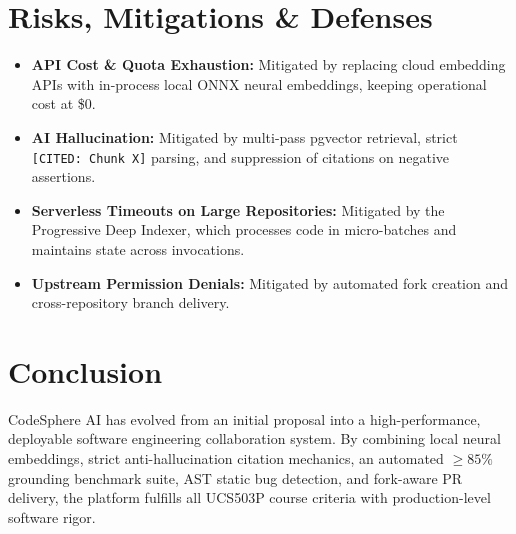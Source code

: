 \documentclass[11pt,a4paper]{article}
\begin{document}
\section{Risks, Mitigations \& Defenses}
\begin{itemize}
    \item \textbf{API Cost \& Quota Exhaustion:} Mitigated by replacing cloud embedding APIs with in-process local ONNX neural embeddings, keeping operational cost at \$0.
    \item \textbf{AI Hallucination:} Mitigated by multi-pass pgvector retrieval, strict \texttt{[CITED: Chunk X]} parsing, and suppression of citations on negative assertions.
    \item \textbf{Serverless Timeouts on Large Repositories:} Mitigated by the Progressive Deep Indexer, which processes code in micro-batches and maintains state across invocations.
    \item \textbf{Upstream Permission Denials:} Mitigated by automated fork creation and cross-repository branch delivery.
\end{itemize}

\section{Conclusion}
CodeSphere AI has evolved from an initial proposal into a high-performance, deployable software engineering collaboration system. By combining local neural embeddings, strict anti-hallucination citation mechanics, an automated $\ge 85\%$ grounding benchmark suite, AST static bug detection, and fork-aware PR delivery, the platform fulfills all UCS503P course criteria with production-level software rigor.
\end{document}
